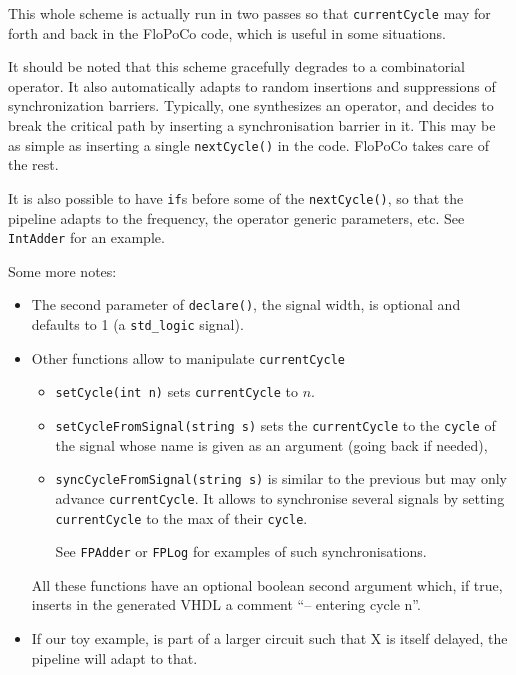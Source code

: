\documentclass{article}
\begin{document}
This whole scheme is actually run in two passes so that
\verb!currentCycle! may for forth and back in the FloPoCo code, which is useful in some situations.

It should be noted that this scheme gracefully degrades to a
combinatorial operator. It also automatically adapts to random
insertions and suppressions of synchronization barriers. Typically,
one synthesizes an operator, and decides to break the critical path by
inserting a synchronisation barrier in it. This may be as simple as
inserting a single \verb!nextCycle()! in the code. FloPoCo takes care of the rest.

It is also possible to have \verb!if!s before some of the
\verb!nextCycle()!, so that the pipeline adapts to the frequency, the
operator generic parameters, etc. See \verb!IntAdder! for an example.

Some more notes:
\begin{itemize}
\item The second parameter of \verb!declare()!, the signal width, is
  optional and defaults to 1 (a \verb!std_logic! signal).

\item Other functions allow to manipulate \verb!currentCycle!
  \begin{itemize}
  \item 
    \verb!setCycle(int n)! sets \verb!currentCycle! to  $n$.  
  \item \verb!setCycleFromSignal(string s)!  
    sets the \verb!currentCycle! to the \verb!cycle! of the signal
    whose name is given as an argument (going back if needed),
  \item 
    \verb!syncCycleFromSignal(string s)! is similar to the previous but may only advance
    \verb!currentCycle!. It allows to synchronise several
    signals by setting \verb!currentCycle! to the max of their
    \verb!cycle!.

See \verb!FPAdder! or \verb!FPLog! for examples of
  such synchronisations. 
  \end{itemize}

All these functions have an optional boolean
  second argument which, if true, inserts in the generated VHDL a
  comment ``-- entering cycle n''.


\item If our toy example, is part of a larger circuit such that X is
  itself delayed, the pipeline will adapt to that.

\end{itemize}
\end{document}
